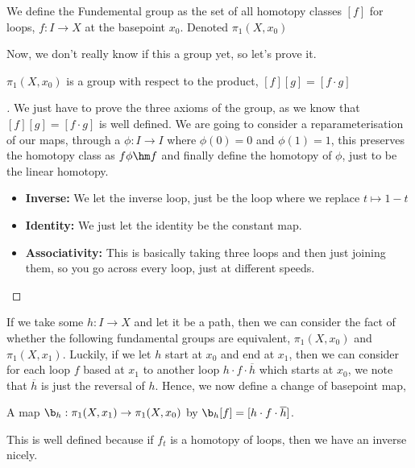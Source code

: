 \begin{ndefi}
  We define the Fundemental group as the set of all homotopy classes $[f]$ for loops, $f: I \to X$ at the basepoint $x_0$. Denoted $\pi_1(X, x_0)$
\end{ndefi}

Now, we don't really know if this a group yet, so let's prove it.
\begin{nprop}
  $\pi_1(X, x_0)$ is a group with respect to the product, $[f][g] = [f \cdot g]$
\end{nprop}
\begin{proof}[]
  We just have to prove the three axioms of the group, as we know that $[f][g] = [f \cdot g]$ is well defined. We are going to consider a reparameterisation of our maps, through a $\phi : I \to I$ where $\phi(0) = 0$ and $\phi(1)=1$, this preserves the homotopy class as $f\phi \hm f$ and finally define the homotopy of $\phi$, just to be the linear homotopy.
  \begin{itemize}
    \item \textbf{Inverse: }We let the inverse loop, just be the loop where we replace $t \mapsto 1 - t$
    \item \textbf{Identity: }We just let the identity be the constant map.
    \item \textbf{Associativity: }This is basically taking three loops and then just joining them, so you go across every loop, just at different speeds.
  \end{itemize}
\end{proof}

If we take some $h : I \to X$ and let it be a path, then we can consider the fact of whether the following fundamental groups are equivalent, $\pi_1(X, x_0)$ and $\pi_1(X, x_1)$. Luckily, if we let $h$ start at $x_0$ and end at $x_1$, then we can consider for each loop $f$ based at $x_1$ to another loop $h \cdot f \cdot \overline{h}$ which starts at $x_0$, we note that $\overline{h}$ is just the reversal of $h$. Hence, we now define a change of basepoint map,
\begin{ndefi}
  A map $\b_h: \pi_1(X, x_1) \to \pi_1(X, x_0)$ by $\b_h[f] = [h \cdot f \cdot \overline{h}]$.
\end{ndefi}
This is well defined because if $f_t$ is a homotopy of loops, then we have an inverse nicely.

